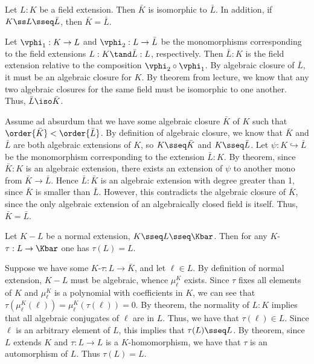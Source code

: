 \documentclass{article}
\begin{document}
\begin{bexercise} %
  Let $ L:K $ be a field extension. Then $ \bar K $ is isomorphic to $ \bar L $.
  In addition, if $ K\ss L \sseq \bar L $, then $ \bar K = \bar L $.
\end{bexercise}
\begin{solution}
  Let $ \vphi_1:K\to L $ and $ \vphi_2:L\to \bar L $ be the monomorphisms corresponding to the field extensions $ L:K \tand \bar L:L$, respectively.
  Then $ \bar L:K $ is the field extension relative to the composition $ \vphi_2\circ \vphi_1 $.
  By algebraic closure of $ \bar L $, it must be an algebraic closure for $ K $.
  By theorem from lecture, we know that any two algebraic closures for the same field must be isomorphic to one another.
  Thus, $ \bar L\iso \bar K $.

  Assume ad absurdum that we have some algebraic closure $ \bar K $ of $ K $ such that $ \order{\bar K} < \order{\bar L}$.
  By definition of algebraic closure, we know that $ \bar K $ and $ \bar L $ are both algebraic extensions of $ K $, so $ K\sseq \bar K $ and $ K\sseq \bar L $.
  Let $ \psi:K\hookrightarrow\bar L $ be the monomorphism corresponding to the extension $ \bar L:K $.
  By theorem, since $ \bar K:K $ is an algebraic extension, there exists an extension of $ \psi $ to another mono from $ \bar K \to \bar L $.
  Hence $ \bar L:\bar K $ is an algebraic extension with degree greater than 1, since $ \bar K $ is smaller than $ \bar L $.
  However, this contradicts the algebraic closure of $ \bar K $, since the only algebraic extension of an algebraically closed field is itself.
  Thus, $ \bar K = \bar L $.
\end{solution}

\begin{bexercise} %
  Let $ K-L $ be a normal extension, $ K\sseq L\sseq \Kbar $.
  Then for any $ K $-\homo $ \tau:L\to \Kbar $ one has $ \tau(L) = L $.
\end{bexercise}
\begin{solution}
  Suppose we have some $ K $-\homo $ \tau:L\to\bar K $, and let $ \ell\in L $.
  By definition of normal extension, $ K-L $ must be algebraic, whence $ \mu_\ell^K $ exists.
  Since $ \tau $ fixes all elements of $ K $ and $ \mu_\ell^K $ is a polynomial with coefficients in $ K $, we can see that $ \tau(\mu_\ell^K(\ell)) = \mu_\ell^K(\tau(\ell)) = 0 $.
  By theorem, the normality of $ L:K $ implies that all algebraic conjugates of $ \ell $ are in $ L $.
  Thus, we have that $ \tau(\ell)\in L $.
  Since $ \ell $ is an arbitrary element of $ L $, this implies that $ \tau(L) \sseq L $.
  By theorem, since $ L $ extends $ K $ and $ \tau:L\to L $ is a $ K $-homomorphism, we have that $ \tau $ is an automorphism of $ L $.
  Thus $ \tau(L) = L $.
\end{solution}
\end{document}

